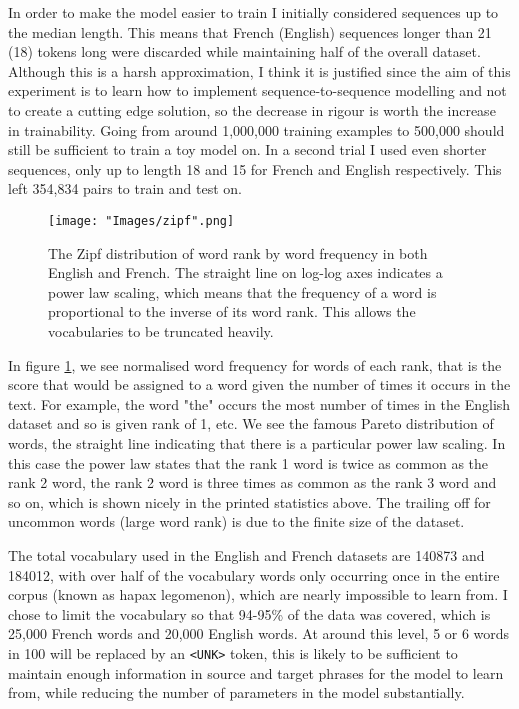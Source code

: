\documentclass[]{article}
\begin{document}
In order to make the model easier to train I initially considered sequences up to the median length. This means that French (English) sequences longer than 21 (18) tokens long were discarded while maintaining half of the overall dataset. Although this is a harsh approximation, I think it is justified since the aim of this experiment is to learn how to implement sequence-to-sequence modelling and not to create a cutting edge solution, so the decrease in rigour is worth the increase in trainability. Going from around 1,000,000 training examples to 500,000 should still be sufficient to train a toy model on. In a second trial I used even shorter sequences, only up to length 18 and 15 for French and English respectively. This left 354,834 pairs to train and test on.

\begin{figure}	\centering
	\texttt{[image: "Images/zipf".png]}
	\caption{The Zipf distribution of word rank by word frequency in both English and French. The straight line on log-log axes indicates a power law scaling, which means that the frequency of a word is proportional to the inverse of its word rank. This allows the vocabularies to be truncated heavily.}
	\label{fig:zipf}
\end{figure}
In figure \ref{fig:zipf}, we see normalised word frequency for words of each rank, that is the score that would be assigned to a word given the number of times it occurs in the text. For example, the word "the" occurs the most number of times in the English dataset and so is given rank of 1, etc. We see the famous Pareto distribution of words, the straight line indicating that there is a particular power law scaling. In this case the power law states that the rank 1 word is twice as common as the rank 2 word, the rank 2 word is three times as common as the rank 3 word and so on, which is shown nicely in the printed statistics above. The trailing off for uncommon words (large word rank) is due to the finite size of the dataset.

The total vocabulary used in the English and French datasets are 140873 and 184012, with over half of the vocabulary words only occurring once in the entire corpus (known as hapax legomenon), which are nearly impossible to learn from. I chose to limit the vocabulary so that 94-95\% of the data was covered, which is 25,000 French words and 20,000 English words. At around this level, 5 or 6 words in 100 will be replaced by an \lstinline{<UNK>} token, this is likely to be sufficient to maintain enough information in source and target phrases for the model to learn from, while reducing the number of parameters in the model substantially. 
\end{document}
